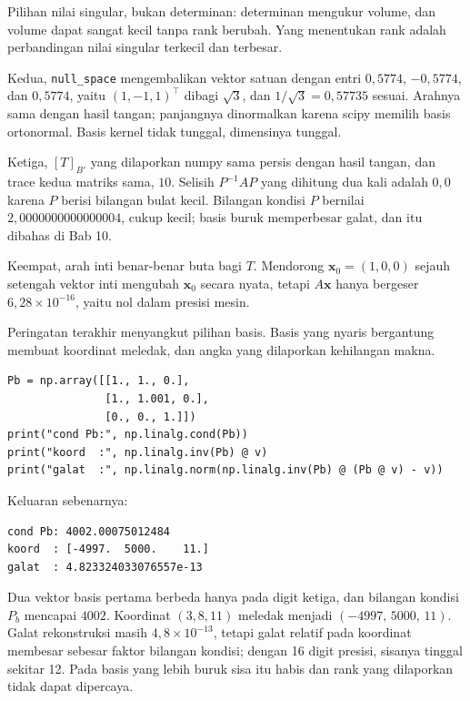 Pilihan nilai singular, bukan determinan: determinan mengukur volume, dan volume dapat
sangat
kecil tanpa rank berubah. Yang menentukan rank adalah perbandingan nilai singular terkecil
dan
terbesar.

Kedua, \texttt{null\_space} mengembalikan vektor satuan dengan entri $0{,}5774$,
$-0{,}5774$, dan $0{,}5774$, yaitu $(1,-1,1)^{\top}$ dibagi $\sqrt{3}$, dan
$1/\sqrt{3}=0{,}57735$ sesuai. Arahnya sama dengan hasil tangan; panjangnya dinormalkan
karena
scipy memilih basis ortonormal. Basis kernel tidak tunggal, dimensinya tunggal.

Ketiga, $[T]_{B'}$ yang dilaporkan numpy sama persis dengan hasil tangan, dan trace
kedua matriks sama, $10$. Selisih $P^{-1}AP$ yang dihitung dua kali adalah $0{,}0$ karena
$P$
berisi bilangan bulat kecil. Bilangan kondisi $P$ bernilai $2{,}0000000000000004$, cukup
kecil;
basis buruk memperbesar galat, dan itu dibahas di Bab 10.

Keempat, arah inti benar-benar buta bagi $T$. Mendorong $\mathbf{x}_{0}=(1,0,0)$ sejauh
setengah vektor inti mengubah $\mathbf{x}_{0}$ secara nyata, tetapi $A\mathbf{x}$ hanya
bergeser
$6{,}28\times10^{-16}$, yaitu nol dalam presisi mesin.

Peringatan terakhir menyangkut pilihan basis. Basis yang nyaris bergantung membuat koordinat
meledak, dan angka yang dilaporkan kehilangan makna.

\begin{lab}
\begin{verbatim}
Pb = np.array([[1., 1., 0.],
               [1., 1.001, 0.],
               [0., 0., 1.]])
print("cond Pb:", np.linalg.cond(Pb))
print("koord  :", np.linalg.inv(Pb) @ v)
print("galat  :", np.linalg.norm(np.linalg.inv(Pb) @ (Pb @ v) - v))
\end{verbatim}
Keluaran sebenarnya:
\begin{verbatim}
cond Pb: 4002.00075012484
koord  : [-4997.  5000.    11.]
galat  : 4.823324033076557e-13
\end{verbatim}
\end{lab}

Dua vektor basis pertama berbeda hanya pada digit ketiga, dan bilangan kondisi $P_{b}$
mencapai $4002$. Koordinat $(3,8,11)$ meledak menjadi $(-4997,\,5000,\,11)$. Galat
rekonstruksi
masih $4{,}8\times10^{-13}$, tetapi galat relatif pada koordinat membesar sebesar faktor
bilangan
kondisi; dengan 16 digit presisi, sisanya tinggal sekitar 12. Pada basis yang lebih buruk
sisa
itu habis dan rank yang dilaporkan tidak dapat dipercaya.

